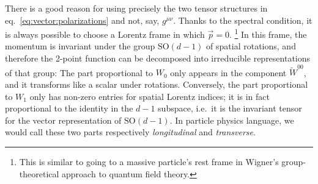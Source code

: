 \documentclass[a4paper,12pt]{article}
\numberwithin{equation}{section}
\begin{document}
There is a good reason for using precisely the two tensor structures in eq.~\eqref{eq:vector:polarizations} and not, say, $g^{\mu\nu}$. Thanks to the spectral condition, it is always possible to choose a Lorentz frame in which $\vec{p} = 0$.%
%
\footnote{This is similar to going to a massive particle's rest frame in Wigner's group-theoretical approach to quantum field theory.}
%
In this frame, the momentum is invariant under the group $\text{SO}(d-1)$ of spatial rotations, and therefore the 2-point function can be decomposed into irreducible representations of that group: The part proportional to $W_0$ only appears in the component $\widetilde{W}^{00}$, and it transforms like a scalar under rotations. Conversely, the part proportional to $W_1$ only has non-zero entries for spatial Lorentz indices; it is in fact proportional to the identity in the $d-1$ subspace, i.e.~it is the invariant tensor for the vector representation of $\text{SO}(d-1)$.
In particle physics language, we would call these two parts respectively \emph{longitudinal} and \emph{transverse}.
\end{document}
